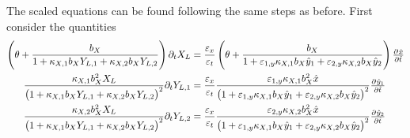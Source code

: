 \documentclass[11pt]{article}
\numberwithin{equation}{section}
\begin{document}
The scaled equations can be found following the same steps as before. First consider the quantities
\begin{subequations}
\label{eq:generalised-x_t-parts}
\begin{align}
    \left( \theta + \frac{b_X}{1 + \kappa_{X,1} b_{X} Y_{L,1} + \kappa_{X,2} b_{X} Y_{L,2}} \right) \partial_t X_L &= \frac{\varepsilon_x}{\varepsilon_t} \left( \theta + \frac{b_X}{1 + \varepsilon_{1,y} \kappa_{X,1} b_{X} \hat{y}_1 + \varepsilon_{2,y} \kappa_{X,2} b_{X} \hat{y}_2 } \right)  \pd{\hat{x}}{\hat{t}}
    \\
    \frac{\kappa_{X,1} b_X^2 X_L}{\big(1 + \kappa_{X,1} b_{X} Y_{L,1} + \kappa_{X,2} b_{X} Y_{L,2} \big)^2} \partial_t Y_{L,1} 
    &=
    \frac{\varepsilon_x}{\varepsilon_t} \frac{\varepsilon_{1,y} \kappa_{X,1} b_X^2 \hat{x}}{\big(1+ \varepsilon_{1,y} \kappa_{X,1} b_X \hat{y}_1 + \varepsilon_{2,y} \kappa_{X,2} b_X \hat{y}_2 \big)^2} \pd{\hat y_1}{\hat t}
    \\
    \frac{ \kappa_{X,2} b_X^2 X_L }{\big(1 + \kappa_{X,1} b_X Y_{L,1} + \kappa_{X,2} b_X Y_{L,2}\big)^2} \partial_t Y_{L,2}
    &=
    \frac{\varepsilon_x}{\varepsilon_t} \frac{\varepsilon_{2,y} \kappa_{X,2} b_X^2 \hat{x}}{\big(1+ \varepsilon_{1,y} \kappa_{X,1} b_X \hat{y}_1 + \varepsilon_{2,y} \kappa_{X,2} b_X \hat{y}_2 \big)^2} \pd{\hat y_2}{\hat t}
\end{align}
\end{subequations}
\end{document}
